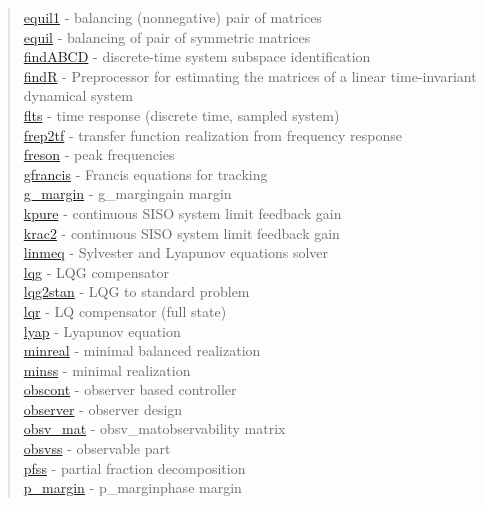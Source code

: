 \begin{quote}
\hyperlink{equil1}{equil1} - {balancing (nonnegative) pair of matrices} \\  
\hyperlink{equil}{equil} - {balancing of pair of symmetric matrices} \\  
\hyperlink{findABCD}{findABCD} - {discrete-time system subspace identification} \\  
\hyperlink{findR}{findR} - {Preprocessor for estimating the matrices of a linear time-invariant dynamical system} \\  
\hyperlink{flts}{flts} - {time response (discrete time, sampled system)  } \\  
\hyperlink{frep2tf}{frep2tf} - {transfer function realization from frequency response} \\  
\hyperlink{freson}{freson} - {peak frequencies} \\  
\hyperlink{gfrancis}{gfrancis} - {Francis equations for tracking} \\  
\hyperlink{g_margin}{g\_margin} - {g_margin}{gain margin} \\  
\hyperlink{kpure}{kpure} - {continuous SISO system limit feedback gain} \\  
\hyperlink{krac2}{krac2} - {continuous SISO system limit feedback gain} \\  
\hyperlink{linmeq}{linmeq} - {Sylvester and Lyapunov equations solver} \\  
\hyperlink{lqg}{lqg} - {LQG compensator} \\  
\hyperlink{lqg2stan}{lqg2stan} - {LQG to standard problem} \\  
\hyperlink{lqr}{lqr} - {LQ compensator (full state)} \\ %
\hyperlink{lyap}{lyap} - {Lyapunov equation} \\  
\hyperlink{minreal}{minreal} - {minimal balanced realization} \\  
\hyperlink{minss}{minss} - {minimal realization} \\  
\hyperlink{obscont}{obscont} - {observer based controller} \\  
\hyperlink{observer}{observer} - {observer design} \\  
\hyperlink{obsv_mat}{obsv\_mat} - {obsv_mat}{observability matrix} \\  
\hyperlink{obsvss}{obsvss} - {observable part} \\  
\hyperlink{pfss}{pfss} - {partial fraction decomposition} \\  
\hyperlink{p_margin}{p\_margin} - {p_margin}{phase margin} \\  

\end{quote}
